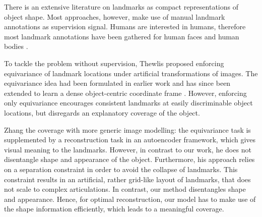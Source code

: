 	There is an extensive literature on landmarks as compact representations of object shape.
	Most approaches, however, make use of manual landmark annotations as supervision signal. Humans are interested in humans, therefore most landmark annotations have been gathered for human faces \cite{wu17faceocclu, ranjan16hyperface, yu16deform, zhang16facealign, zhu15facecoarse, zhang14facemultitask, pedersoli14facedeform} and human bodies \cite{ionescu11posestructured, toshev14deeppose, pfister15flowingconv, wei16posemachine, newell16hourglass, lim18posetransform, cao17affinityfield}.

	To tackle the problem without supervision, Thewlis \etal \cite{thewlis17} proposed enforcing equivariance of landmark locations under artificial transformations of images. The equivariance idea had been formulated in earlier work \cite{lenc16covariant} and has since been extended to learn a dense object-centric coordinate frame \cite{thewlis17dense}. However, enforcing only equivariance encourages consistent landmarks at easily discriminable object locations, but disregards an explanatory coverage of the object.

	Zhang \etal \cite{zhang18} the coverage with more generic image modelling: the equivariance task is supplemented by a reconstruction task in an autoencoder framework, which gives visual meaning to the landmarks. However, in contrast to our work, he does not disentangle shape and appearance of the object. Furthermore, his approach relies on a separation constraint in order to avoid the collapse of landmarks.
	This constraint results in an artificial, rather grid-like layout of landmarks, that does not scale to complex articulations.
	In contrast, our method disentangles shape and appearance. Hence, for optimal reconstruction, our model has to make use of the shape information efficiently, which leads to a meaningful coverage.

